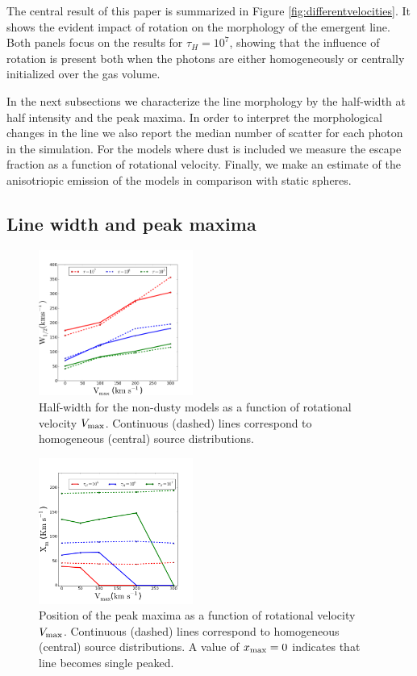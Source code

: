 \documentclass{emulateapj}
\newcommand{\ly}{{\ifmmode{{\rm Ly}\alpha~}\else{Ly$\alpha$~}\fi}}
\begin{document}
The central result of this paper is summarized in Figure
\ref{fig:differentvelocities}. It shows the evident
impact of rotation on the morphology of the emergent \ly line. Both
panels focus on the results for $\tau_{H}=10^{7}$, showing that the
influence of rotation is present both when the photons are either
homogeneously or centrally initialized over the gas volume.  

In the next subsections we characterize the line morphology by
the half-width at half intensity and the peak maxima. In order to
interpret the morphological changes in the line we also report the
median number of scatter for each \ly photon in the
simulation. For the models where dust is included we measure the 
escape fraction as a function of rotational velocity. Finally, we make
an estimate of the anisotriopic emission of the models in comparison
with static spheres.


\subsection{Line width and peak maxima}
\label{sec:widthpeak}


\begin{figure}
    \includegraphics[width=0.45\textwidth]{WidthVvsVmax.png}
    \caption{Half-width for the non-dusty models as a function of
      rotational velocity $V_{\rm max}$. Continuous (dashed) lines
      correspond to homogeneous (central) source
      distributions. \label{fig:widthvsvelocity}} 
\end{figure}


\begin{figure}
    \includegraphics[width=0.45\textwidth]{maximumVvsVmax.png}
\caption{Position of the peak maxima as a function of rotational
  velocity $V_{\rm max}$. Continuous (dashed) lines correspond to
  homogeneous (central) source distributions. A value of $x_{\rm
    max}=0$ indicates that line becomes single
  peaked. \label{fig:maximumsvsvelocity}}  
\end{figure}
\end{document}
